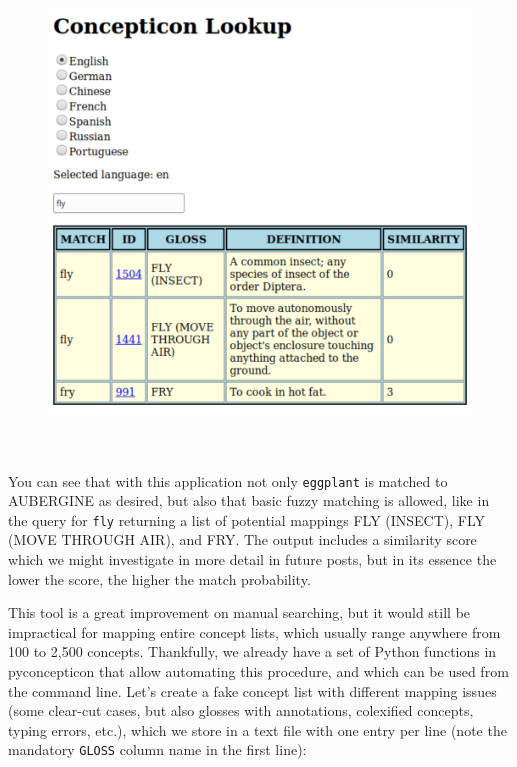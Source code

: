 \documentclass[
  a4paper,
  14pt,
  oneside,
  tablecaptionabove
]{scrbook}
\newcommand{\passthrough}[1]{#1}
\begin{document}
\begin{figure}[h!]
\centering
\includegraphics[width=5.20833in,height=5.02083in]{images/__f-origin.hypotheses.org_wp-content_blogs.dir_4500_files_2019_03_Screenshot_2019-03-26-Concepticon-Lookup-fly-500x482.png}
\end{figure}



You can see that with this application not only
\passthrough{\lstinline!eggplant!} is matched to AUBERGINE as desired,
but also that basic fuzzy matching is allowed, like in the query for
\passthrough{\lstinline!fly!} returning a list of potential mappings FLY
(INSECT), FLY (MOVE THROUGH AIR), and FRY. The output includes
a similarity score which we might investigate in more detail in future
posts, but in its essence the lower the score, the higher the match
probability.

This tool is a great improvement on manual searching, but it would still
be impractical for mapping entire concept lists, which usually range
anywhere from 100 to 2,500 concepts. Thankfully, we already have a set
of Python functions in pyconcepticon that allow automating this
procedure, and which can be used from the command line. Let's create a
fake concept list with different mapping issues (some clear-cut cases,
but also glosses with annotations, colexified concepts, typing errors,
etc.), which we store in a text file with one entry per line (note the
mandatory \passthrough{\lstinline!GLOSS!} column name in the first
line):
\end{document}
